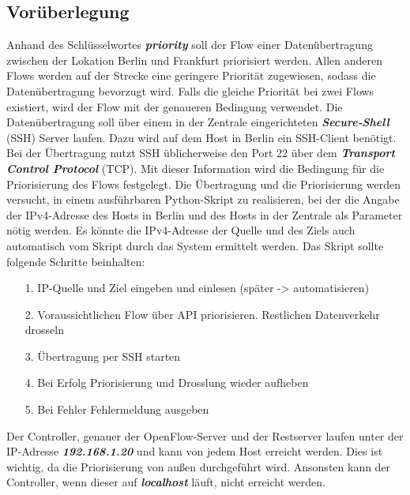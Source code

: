 \documentclass[fontsize=12pt,paper=a4,open=any,parskip=half,
  twoside=false,toc=listof,toc=bibliography,fleqn,leqno,
  captions=nooneline,captions=tableabove,british]{scrbook}
\begin{document}
\subsection{Vorüberlegung}
Anhand des Schlüsselwortes \textit{\textbf{priority}} soll der Flow einer Datenübertragung zwischen der Lokation Berlin und Frankfurt priorisiert werden. Allen anderen Flows werden auf der Strecke eine geringere Priorität zugewiesen, sodass die Datenübertragung bevorzugt wird. Falls die gleiche Priorität bei zwei Flows existiert, wird der Flow mit der genaueren Bedingung verwendet. Die Datenübertragung soll über einem in der Zentrale eingerichteten \textit{\textbf{Secure-Shell}} (SSH) Server laufen. Dazu wird auf dem Host in Berlin ein SSH-Client benötigt. Bei der Übertragung nutzt SSH üblicherweise den Port 22 über dem \textit{\textbf{Transport Control Protocol}} (TCP). Mit dieser Information wird die Bedingung für die Priorisierung des Flows festgelegt. Die Übertragung und die Priorisierung werden versucht, in einem ausführbaren Python-Skript zu realisieren, bei der die Angabe der IPv4-Adresse des Hosts in Berlin und des Hosts in der Zentrale als Parameter nötig werden. Es könnte die IPv4-Adresse der Quelle und des Ziels auch automatisch vom Skript durch das System ermittelt werden. Das Skript sollte folgende Schritte beinhalten:
\begin{itemize}
\item[1.] IP-Quelle und Ziel eingeben und einlesen (später -> automatisieren)
\item[2.] Voraussichtlichen Flow über API priorisieren. Restlichen Datenverkehr drosseln
\item[3.] Übertragung per SSH starten
\item[4.] Bei Erfolg Priorisierung und Drosslung wieder aufheben
\item[5.] Bei Fehler Fehlermeldung ausgeben
\end{itemize}
Der Controller, genauer der OpenFlow-Server und der Restserver laufen unter der IP-Adresse \textit{\textbf{192.168.1.20}} und kann von jedem Host erreicht werden. Dies ist wichtig, da die Priorisierung von außen durchgeführt wird. Ansonsten kann der Controller, wenn dieser auf \textit{\textbf{localhost}} läuft, nicht erreicht werden.
\end{document}
